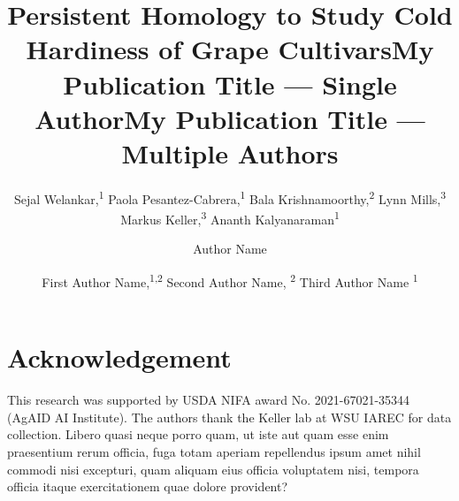 \documentclass[letterpaper]{article} %
\title{Persistent Homology to Study Cold Hardiness of Grape Cultivars}
\author{
    Sejal Welankar,\textsuperscript{\rm 1}
    Paola Pesantez-Cabrera,\textsuperscript{\rm 1}
    Bala Krishnamoorthy,\textsuperscript{\rm 2}
    Lynn Mills,\textsuperscript{\rm 3}
    Markus Keller,\textsuperscript{\rm 3}
    Ananth Kalyanaraman\textsuperscript{\rm 1}
}
\title{My Publication Title --- Single Author}
\author {
    Author Name
}
\title{My Publication Title --- Multiple Authors}
\author {
    First Author Name,\textsuperscript{\rm 1,\rm 2}
    Second Author Name, \textsuperscript{\rm 2}
    Third Author Name \textsuperscript{\rm 1}
}
\begin{document}
\maketitle

\begin{abstract}



\end{abstract}














\section*{Acknowledgement}
This research was supported by USDA NIFA award No. 2021-67021-35344 (AgAID AI Institute).
The authors thank the Keller lab at WSU IAREC for data  collection.
Libero quasi neque porro quam, ut iste aut quam esse enim praesentium rerum officia, fuga totam aperiam repellendus ipsum amet nihil commodi nisi excepturi, quam aliquam eius officia voluptatem nisi, tempora officia itaque exercitationem quae dolore provident?\clearpage

\end{document}
